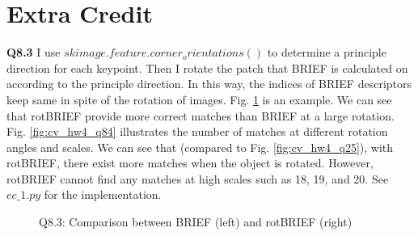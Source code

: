 \documentclass[
  course = {{16-720B Computer Vision}},
  quartile = {{1}},
  assignment = 4\ -\ Feature\ Descriptors\ \&\ Homographies\ \& \  RANSAC,
  name = {{Kangle Deng}},
  email = {{kangled@andrew.cmu.edu}},
  firstexercise = 1
]{aga-homework}
\begin{document}
\section{Extra Credit}

\noindent \textbf{Q8.3} I use $skimage.feature.corner_orientations()$ to determine a principle direction for each keypoint. Then I rotate the patch that BRIEF is calculated on according to the principle direction. In this way, the indices of BRIEF descriptors keep same in spite of the rotation of images. Fig. \ref{fig:cv_hw4_q83_c} is an example. We can see that rotBRIEF provide more correct matches than BRIEF at a large rotation. Fig. \ref{fig:cv_hw4_q84} illustrates the number of matches at different rotation angles and scales. We can see that (compared to Fig. \ref{fig:cv_hw4_q25}), with rotBRIEF, there exist more matches when the object is rotated. However, rotBRIEF cannot find any matches at high scales such as 18, 19, and 20. See $ec\_1.py$ for the implementation.

\begin{figure}
    \centering
    \caption{Q8.3: Comparison between BRIEF (left) and rotBRIEF (right)}
    \label{fig:cv_hw4_q83_c}
\end{figure}
\end{document}
